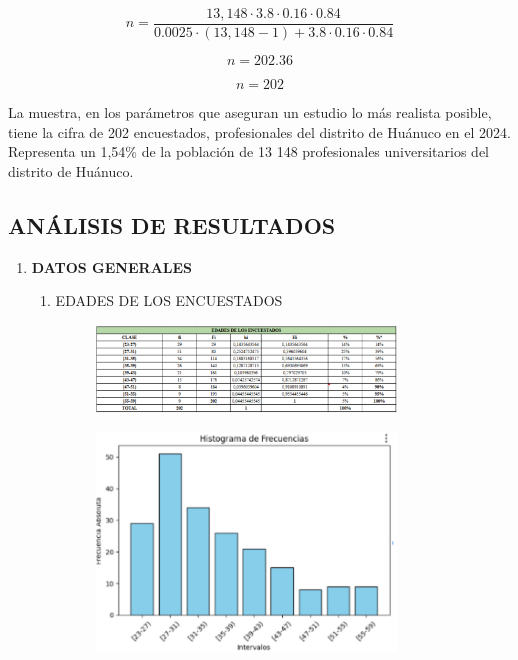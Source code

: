 \documentclass[12pt, a4paper]{article}
\begin{document}
\[
n = \frac{13,148 \cdot 3.8 \cdot 0.16 \cdot 0.84}{0.0025 \cdot (13,148 - 1) + 3.8 \cdot 0.16 \cdot 0.84}
\]

\[
n = 202.36
\]

\[
n = 202
\]

La muestra, en los parámetros que aseguran un estudio lo más realista posible, tiene la cifra de 202 encuestados, profesionales del distrito de Huánuco en el 2024. Representa un 1,54\% de la población de 13 148 profesionales universitarios del distrito de Huánuco. 

\subsection{ANÁLISIS DE RESULTADOS}
\begin{enumerate}
    \item \textbf{DATOS GENERALES}
    \begin{enumerate}
        \item EDADES DE LOS ENCUESTADOS
        \begin{figure}[H]
            \begin{center}
                \includegraphics[width=0.80\textwidth]{images/edadencuestados.png}
            \end{center}
            \label{fig:edadencuestados}
        \end{figure}
        \begin{figure}[H]
            \begin{center}
                \includegraphics[width=0.80\textwidth]{images/histogramaEdad.png}

\end{center}
\end{figure}
\end{enumerate}
\end{enumerate}
\end{document}
